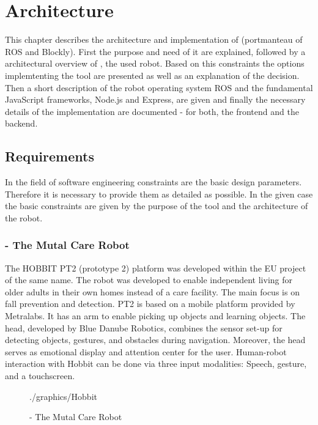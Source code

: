 \chapter{Architecture}
This chapter describes the architecture and implementation of \toolname{} (portmanteau of ROS and Blockly). First the purpose and need of it are explained, followed by a architectural overview of \hobbit{}, the used robot. Based on this constraints the options implemtenting the tool are presented as well as an explanation of the decision. Then a short description of the robot operating system ROS and the fundamental JavaScript frameworks, Node.js and Express, are given and finally the necessary details of the implementation are documented - for both, the frontend and the backend.

\section{Requirements} \label{sec:requirements}
In the field of software engineering constraints are the basic design parameters. Therefore it is necessary to provide them as detailed as possible. In the given case the basic constraints are given by the purpose of the tool and the architecture of the robot.

\subsection{\hobbit{} - The Mutal Care Robot}
The HOBBIT PT2 (prototype 2) platform was developed within the EU project of the same name. The robot was developed to enable independent living for older adults in their own homes instead of a care facility. The main focus is on fall prevention and detection. PT2 is based on a mobile platform provided by Metralabs. It has an arm to enable picking up objects and learning objects. The head, developed by Blue Danube Robotics, combines the sensor set-up for detecting objects, gestures, and obstacles during navigation. Moreover, the head serves as emotional display and attention center for the user. Human-robot interaction with Hobbit can be done via three input modalities: Speech, gesture, and a touchscreen. \cite{HobbitACIN}\\

\begin{figure}[htbp]
	\centering
	\begin{overpic}[width=0.3\linewidth]{./graphics/Hobbit}
	\end{overpic}
	\caption{\hobbit{} - The Mutal Care Robot}%
	\label{fig:HobbitPic}%
\end{figure}

